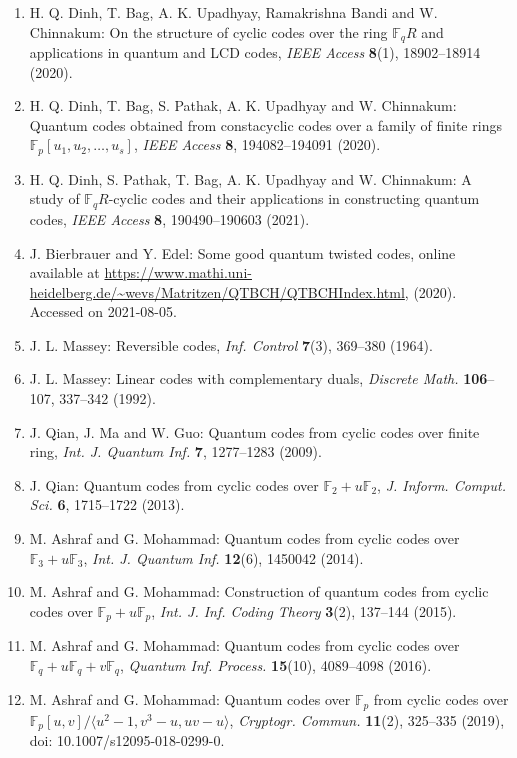 \documentclass[12pt]{article}
\begin{document}
\begin{enumerate}
\item H. Q. Dinh, T. Bag, A. K. Upadhyay, Ramakrishna Bandi and W. Chinnakum: On the structure of cyclic codes over the ring $\mathbb{F}_qR$ and applications in quantum and LCD codes, \textit{IEEE Access} \textbf{8}(1), 18902--18914 (2020).
\item H. Q. Dinh, T. Bag, S. Pathak, A. K. Upadhyay and W. Chinnakum: Quantum codes obtained from constacyclic codes over a family of finite rings $\mathbb{F}_p[u_1, u_2, \dots, u_s]$, \textit{IEEE Access} \textbf{8}, 194082--194091 (2020).
\item H. Q. Dinh, S. Pathak, T. Bag, A. K. Upadhyay and W. Chinnakum: A study of $\mathbb{F}_qR$-cyclic codes and their applications in constructing quantum codes, \textit{IEEE Access} \textbf{8}, 190490--190603 (2021).
\item J. Bierbrauer and Y. Edel: Some good quantum twisted codes, online available at \url{https://www.mathi.uni-heidelberg.de/~wevs/Matritzen/QTBCH/QTBCHIndex.html}, (2020). Accessed on 2021-08-05.
\item J. L. Massey: Reversible codes, \textit{Inf. Control} \textbf{7}(3), 369--380 (1964).
\item J. L. Massey: Linear codes with complementary duals, \textit{Discrete Math.} \textbf{106}--107, 337--342 (1992).
\item J. Qian, J. Ma and W. Guo: Quantum codes from cyclic codes over finite ring, \textit{Int. J. Quantum Inf.} \textbf{7}, 1277--1283 (2009).
\item J. Qian: Quantum codes from cyclic codes over $\mathbb{F}_2 + u\mathbb{F}_2$, \textit{J. Inform. Comput. Sci.} \textbf{6}, 1715--1722 (2013).
\item M. Ashraf and G. Mohammad: Quantum codes from cyclic codes over $\mathbb{F}_3 + u\mathbb{F}_3$, \textit{Int. J. Quantum Inf.} \textbf{12}(6), 1450042 (2014).
\item M. Ashraf and G. Mohammad: Construction of quantum codes from cyclic codes over $\mathbb{F}_p + u\mathbb{F}_p$, \textit{Int. J. Inf. Coding Theory} \textbf{3}(2), 137--144 (2015).
\item M. Ashraf and G. Mohammad: Quantum codes from cyclic codes over $\mathbb{F}_q + u\mathbb{F}_q + v\mathbb{F}_q$, \textit{Quantum Inf. Process.} \textbf{15}(10), 4089--4098 (2016).
\item M. Ashraf and G. Mohammad: Quantum codes over $\mathbb{F}_p$ from cyclic codes over $\mathbb{F}_p[u,v]/\langle u^2 - 1, v^3 - u, uv - u \rangle$, \textit{Cryptogr. Commun.} \textbf{11}(2), 325--335 (2019), doi: 10.1007/s12095-018-0299-0.

\end{enumerate}
\end{document}
